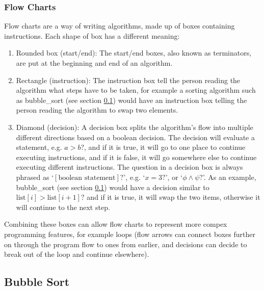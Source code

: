         \subsubsection{Flow Charts} \label{flow_charts}
            Flow charts are a way of writing algorithms, made up of boxes containing instructions.
            Each shape of box has a different meaning:
            \begin{enumerate}
                \item Rounded box (start/end):
                    The start/end boxes, also known as terminators, are put at the beginning and end of an algorithm.
                \item Rectangle (instruction):
                    The instruction box tell the person reading the \gls{algorithm} what steps have to be taken, for example a sorting \gls{algorithm} such as \gls{bubble_sort} (see section \ref{bubble_sort}) would have an instruction box telling the person reading the algorithm to swap two elements.
                \item Diamond (decision):
                    A decision box splits the \gls{algorithm}'s flow into multiple different directions based on a boolean decision.
                    The decision will evaluate a statement, e.g. $a>b?$, and if it is true, it will go to one place to continue executing instructions, and if it is false, it will go somewhere else to continue executing different instructions.
                    The question in a decision box is always phrased as `$[\text{boolean statement}]?$', e.g. `$x=3?$', or `$\phi\wedge\psi?$'.
                    As an example, \gls{bubble_sort} (see section \ref{bubble_sort}) would have a decision similar to $\text{list}[i]>\text{list}[i+1]?$ and if it is true, it will swap the two items, otherwise it will continue to the next step.
            \end{enumerate}
            Combining these boxes can allow flow charts to represent more compex programming features, for example loops (flow arrows can connect boxes further on through the program flow to ones from earlier, and decisions can decide to break out of the loop and continue elsewhere).

    \newpage

    \subsection{Bubble Sort} \label{bubble_sort}
